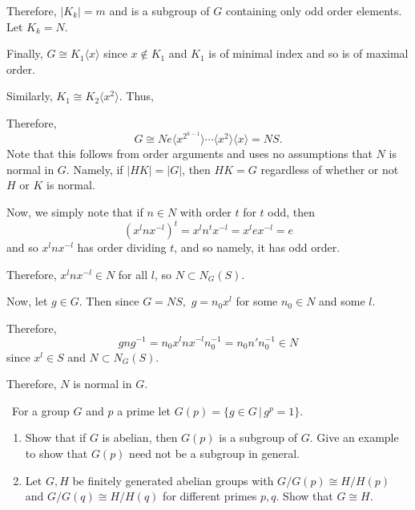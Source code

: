 \documentclass[12pt]{AlgebraQual}
\begin{document}
\begin{solution}
\begin{enumerate}[label=(\alph*)]
    Therefore, $|K_k|=m$ and is a subgroup of $G$ containing only odd order elements. Let $K_k=N.$

    Finally, $G\cong K_1\langle x\rangle$ since $x\notin K_1$ and $K_1$ is of minimal index and so is of maximal order.

    Similarly, $K_1\cong K_2\langle x^2\rangle$. Thus,

    Therefore, $$G\cong Ne\langle x^{2^{k-1}}\rangle\cdots\langle x^2\rangle\langle x\rangle=NS.$$ Note that this follows from order arguments and uses no assumptions that $N$ is normal in $G.$ Namely, if $|HK|=|G|$, then $HK=G$ regardless of whether or not $H$ or $K$ is normal.

    Now, we simply note that if $n\in N$ with order $t$ for $t$ odd, then $$(x^lnx^{-l})^t=x^ln^tx^{-l}=x^lex^{-l}=e$$ and so $x^lnx^{-l}$ has order dividing $t$, and so namely, it has odd order.

    Therefore, $x^lnx^{-l}\in N$ for all $l$, so $N\subset N_G(S).$

    Now, let $g\in G.$ Then since $G=NS,$ $g=n_0x^l$ for some $n_0\in N$ and some $l.$

    Therefore, $$gng^{-1}=n_0x^lnx^{-l}n_0^{-1}=n_0n'n_0^{-1}\in N$$ since $x^l\in S$ and $N\subset N_G(S).$

    Therefore, $N$ is normal in $G.$
\end{enumerate}
\end{solution}
\newpage

\begin{problem} $\,$
For a group $G$ and $p$ a prime let $G(p)=\{g\in G\,|\,g^p=1\}.$
\begin{enumerate}[label=(\alph*)]
    \item Show that if $G$ is abelian, then $G(p)$ is a subgroup of $G.$ Give an example to show that $G(p)$ need not be a subgroup in general.
    \item Let $G,H$ be finitely generated abelian groups with $G/G(p)\cong H/H(p)$ and $G/G(q)\cong H/H(q)$ for different primes $p,q$. Show that $G\cong H.$
\end{enumerate}
\end{problem}
\end{document}
